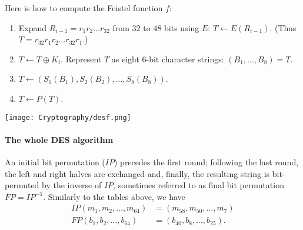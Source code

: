 \documentclass[a4paper, 11pt, openany]{book}
\numberwithin{equation}{section}
\theoremstyle{plain}
\theoremstyle{definition}
\begin{document}
Here is how to compute the Feistel function $f$:
\begin{enumerate}
    \item Expand $R_{i-1} = r_1 r_2 \dots r_{32}$ from $32$ to $48$ bits using $E$:
$T \gets E(R_{i-1})$. (Thus $T = r_{32} r_1 r_2 \dots r_{32} r_1$.)

    \item $T \gets T \oplus K_i$. Represent $T$ as eight $6$-bit character strings: $(B_1, \dots ,B_8) = T$.
    
    \item $T \gets (S_1(B_1), S_2(B_2), \dots, S_8(B_8))$.
    
    \item $T \gets P(T)$.
\end{enumerate}

\begin{center}
    \texttt{[image: Cryptography/desf.png]}
\end{center}





\paragraph{The whole DES algorithm}
An initial bit permutation ($IP$) precedes the first round; following the last round, the left and right halves are exchanged and, finally, the resulting string is bit-permuted by the inverse of $IP$, sometimes referred to as final bit permutation $FP = IP^{-1}$. Similarly to the tables above, we have
\begin{align*}
    IP(m_1, m_2, \dots, m_{64}) &= (m_{58}, m_{50}, \dots, m_7)\\
    FP(b_1, b_2, \dots, b_{64}) &= (b_{40}, b_8, \dots, b_{25}).
\end{align*}
\end{document}
